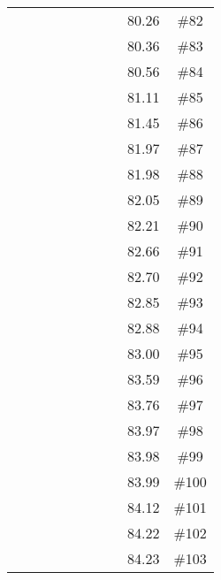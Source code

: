 \begin{longtable}{|c|c|c|c|c|c|c|c|c|c|}
 \x    & \x    & \x    & \x    &       &       & \x    &       & 80.26 & \#82 \\
 \x    & \x    & \x    &       &       &       & \x    &       & 80.36 & \#83 \\
 \x    & \x    & \x    &       & \x\m  &       &       & \x    & 80.56 & \#84 \\
 \x    & \x    & \x    & \x    &       &       &       & \x    & 81.11 & \#85 \\
 \x    & \x    & \x    &       &       & \x    & \x    &       & 81.45 & \#86 \\
 \x    & \x    & \x    &       &       & \x\m  &       & \x\m  & 81.97 & \#87 \\
 \x    & \x    & \x    & \x    &       & \x\m  &       & \x\m  & 81.98 & \#88 \\
 \x    & \x    & \x    &       & \x\m  &       &       &       & 82.05 & \#89 \\
 \x    & \x    &       &       &       &       &       &       & 82.21 & \#90 \\
 \x    & \x    & \x    & \x    &       & \x    &       & \x    & 82.66 & \#91 \\
 \x    & \x    &       & \x    & \x    & \x    &       &       & 82.70 & \#92 \\
 \x    & \x    & \x    & \x    &       & \x\m  & \x\m  &       & 82.85 & \#93 \\
 \x    & \x    &       &       & \x    & \x    &       & \x    & 82.88 & \#94 \\
 \x    & \x    &       &       & \x    &       &       & \x    & 83.00 & \#95 \\
 \x    & \x    & \x    &       &       & \x    & \x\m  &       & 83.59 & \#96 \\
 \x    & \x    & \x    & \x    & \x    &       & \x\m  &       & 83.76 & \#97 \\
 \x    & \x    &       &       & \x    & \x    & \x    &       & 83.97 & \#98 \\
 \x    & \x    &       & \x    &       & \x    &       &       & 83.98 & \#99 \\
 \x    & \x    & \x    &       &       &       & \x\m  &       & 83.99 & \#100 \\
 \x    & \x    & \x    & \x    & \x    & \x\m  & \x\m  &       & 84.12 & \#101 \\
 \x    & \x    & \x    &       &       & \x    &       & \x    & 84.22 & \#102 \\
 \x    & \x    & \x    & \x    &       & \x    &       & \x\m  & 84.23 & \#103 \\

\end{longtable}
